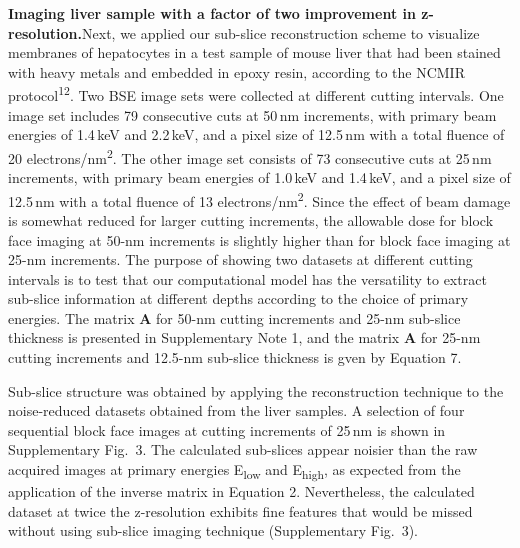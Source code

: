 \documentclass{article}
\newcommand{\cit}[1]{\textsuperscript{#1}}
\begin{document}
\medskip
\noindent\textbf{Imaging liver sample with a factor of two improvement in z-resolution.}\quad Next, we applied our sub-slice reconstruction scheme to visualize membranes of hepatocytes in a test sample of mouse liver that had been stained with heavy metals and embedded in epoxy resin, according to the NCMIR protocol\cit{12}. Two BSE image sets were collected at different cutting intervals. One image set includes 79 consecutive cuts at 50\,nm increments, with primary beam energies of 1.4\,keV and 2.2\,keV, and a pixel size of 12.5\,nm with a total fluence of 20 electrons/nm\textsuperscript{2}. The other image set consists of 73 consecutive cuts at 25\,nm increments, with primary beam energies of 1.0\,keV and 1.4\,keV, and a pixel size of 12.5\,nm with a total fluence of 13 electrons/nm\textsuperscript{2}. Since the effect of beam damage is somewhat reduced for larger cutting increments, the allowable dose for block face imaging at 50-nm increments is slightly higher than for block face imaging at 25-nm increments. The purpose of showing two datasets at different cutting intervals is to test that our computational model has the versatility to extract sub-slice information at different depths according to the choice of primary energies. The matrix \textbf{A} for 50-nm cutting increments and 25-nm sub-slice thickness is presented in Supplementary Note 1, and the matrix \textbf{A} for 25-nm cutting increments and 12.5-nm sub-slice thickness is gven by Equation 7.

Sub-slice structure was obtained by applying the reconstruction technique to the noise-reduced datasets obtained from the liver samples. A selection of four sequential block face images at cutting increments of 25\,nm is shown in Supplementary Fig.~3. The calculated sub-slices appear noisier than the raw acquired images at primary energies E\textsubscript{low} and E\textsubscript{high}, as expected from the application of the inverse matrix in Equation 2. Nevertheless, the calculated dataset at twice the z-resolution exhibits fine features that would be missed without using sub-slice imaging technique (Supplementary Fig.~3).
\end{document}
